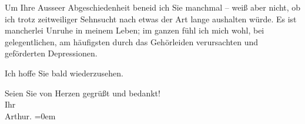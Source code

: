 \pstart
           Um Ihre Ausseer Abgeschiedenheit beneid ich Sie
               manchmal – weiß aber nicht, ob ich  trotz
               zeitweiliger Sehnsucht nach etwas der Art lange aushalten würde. Es ist mancherlei
               Unruhe in meinem Leben; im ganzen fühl ich mich wohl, bei gelegentlichen, am
               häufigsten durch das Gehörleiden verursachten und geförderten Depressionen.\pend
           
\pstart
           Ich hoffe Sie bald wiederzusehen.\pend
           
\pstart
           Seien Sie von Herzen gegrüßt und bedankt!{\\[\baselineskip]}Ihr{\\[\baselineskip]}\spacefill\mbox{Arthur.}\pend
           \leftskip=0em{}\endnumbering{}  \newcommand{\dateiname}{L02455}\newcommand{\titel}{Arthur Schnitzler an Hugo Hofmannsthal, 16. 11. 1925}\newcommand{\editorInnen}{Martin Anton Müller und Gerd-Hermann Susen}
